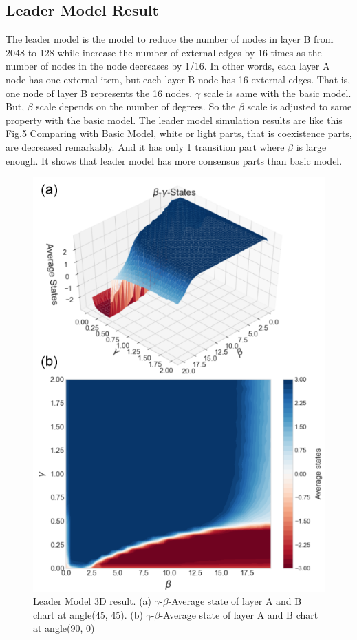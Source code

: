 \documentclass[english]{cccconf}
\begin{document}
\subsection{Leader Model Result}
 The leader model is the model to reduce the number of nodes in layer B from 2048 to 128 while increase the number of external edges by 16 times as the number of nodes in the node decreases by 1/16.  In other words, each layer A node has one external item, but each layer B node has 16 external edges. That is, one node of layer B represents the 16 nodes. $\gamma$ scale is same with the basic model. But, $\beta$ scale depends on the number of degrees. So the $\beta$ scale is adjusted to same property with the basic model.
The leader model simulation results are like this Fig.5
Comparing with Basic Model, white or light parts, that is coexistence parts, are decreased remarkably. And it has only 1 transition part where $\beta$ is large enough. It shows that leader model has more consensus parts than basic model.
\begin{figure}[!htb]
  \centering
  \includegraphics[width=\hsize]{FIG5.png}
  \caption{Leader Model 3D result. (a) $\gamma$-$\beta$-Average state of layer A and B chart at angle(45, 45). (b) $\gamma$-$\beta$-Average state of layer A and B chart at angle(90, 0)}
  \label{Fig5}
\end{figure}
\end{document}
